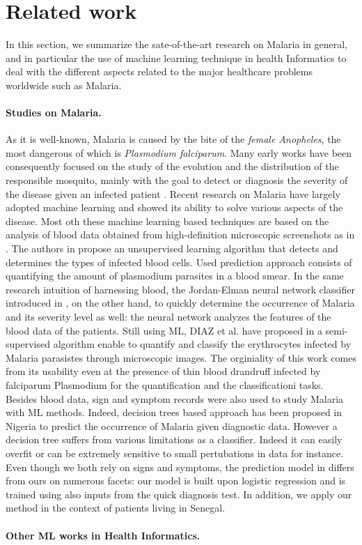 \section{Related work}\label{related_work}
In this section, we summarize the sate-of-the-art research on Malaria in general, and in particular the
use of machine learning technique in health Informatics to deal with the different aspects related to the 
major healthcare problems worldwide such as Malaria.

\paragraph*{Studies on Malaria.}
As it is well-known, Malaria is caused by the bite of the \emph{female Anopheles}, the most dangerous of which
is \emph{Plasmodium falciparum}. Many early works have been consequently focused on the study of the evolution and
the distribution of the responsible mosquito, mainly with the goal to detect or diagnosis the severity of the 
disease given an infected patient \cite{Fe03,Al09}. Recent research on Malaria have largely adopted machine learning
and showed its ability to solve various aspects of the disease. Most oth these machine learning based techniques are 
based on the analysis of blood data obtained from high-definition microscopic screenshots as in \cite{Ku18}. The authors
in \cite{Ku18} propose an unsupervised learning algorithm that detects and determines the types of infected blood cells.
Used prediction approach consists of quantifying the amount of plasmodium parasites in a blood smear. In the same research intuition
of harnessing blood, the Jordan-Elman neural network classifier introduced in \cite{Ha15}, on the other hand, to quickly determine the occurrence 
of Malaria and its severity level as well: the neural network analyzes the features of the blood data of the patients.  
Still using ML, DIAZ et al. have proposed in \cite{Dia09} a semi-supervised algorithm enable to quantify and classify the 
erythrocytes infected by Malaria parasistes through microscopic images. The orginiality of this work comes from its usability
even at the presence of thin blood drandruff infected by falciparum Plasmodium for the quantification and the classificationi tasks.
Besides blood data, sign and symptom records were also used to study Malaria with ML methods. Indeed, decision trees based approach
has been proposed in Nigeria \cite{Ug10} to predict the occurrence of Malaria given diagnostic data. However a decision tree suffers 
from various limitations as a classifier. Indeed it can easily overfit or can be extremely sensitive to small pertubations in data for instance.
Even though we both rely on signs and symptoms, the prediction model in \cite{Ug10} differs from ours on numerous facets: our model is built upon
logistic regression and is trained using also inputs from the quick diagnosis test. In addition, we apply our method in the context of patients living in Senegal. 

\paragraph*{Other ML works in Health Informatics.}
